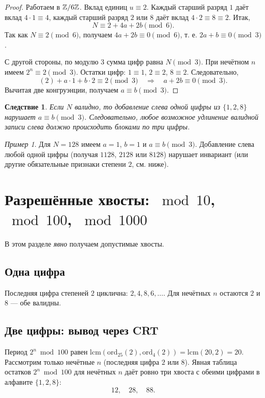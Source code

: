 \documentclass[12pt]{article}
\theoremstyle{plain}
\newtheorem{corollary}{Следствие}
\theoremstyle{remark}
\newtheorem*{example}{Пример}
\begin{document}
\begin{proof}
Работаем в $\Bbb Z/6\Bbb Z$. Вклад единиц $u\equiv2$. Каждый старший разряд $1$ даёт вклад $4\cdot1\equiv4$, каждый старший разряд $2$ или $8$ даёт вклад $4\cdot2\equiv8\equiv2$. Итак,
\[
N\equiv 2 + 4a + 2b \pmod6.
\]
Так как $N\equiv2\pmod6$, получаем $4a+2b\equiv0\pmod6$, т. е. $2a+b\equiv0\pmod3$.

С другой стороны, по модулю $3$ сумма цифр равна $N\pmod3$. При нечётном $n$ имеем $2^n\equiv2\pmod3$. Остатки цифр: $1\equiv1$, $2\equiv2$, $8\equiv2$. Следовательно,
\[
(2) + a\cdot1 + b\cdot2 \equiv 2 \pmod3 \quad\Rightarrow\quad a+2b\equiv0\pmod3.
\]
Вычитая две конгруэнции, получаем $a\equiv b\pmod3$.
\end{proof}

\begin{corollary}\label{cor:blocks}
Если $N$ валидно, то добавление слева одной цифры из $\{1,2,8\}$ нарушает $a\equiv b\pmod3$. Следовательно, любое возможное удлинение валидной записи слева должно происходить блоками по три цифры.
\end{corollary}

\begin{example}
Для $N=128$ имеем $a=1$, $b=1$ и $a\equiv b\pmod3$. Добавление слева любой одной цифры (получая $1128$, $2128$ или $8128$) нарушает инвариант (или другие обязательные признаки степени $2$, см. ниже).
\end{example}

\section{Разрешённые хвосты: \texorpdfstring{$\bmod 10$}{mod 10}, \texorpdfstring{$\bmod 100$}{mod 100}, \texorpdfstring{$\bmod 1000$}{mod 1000}}
В этом разделе \emph{явно} получаем допустимые хвосты.

\subsection*{Одна цифра}
Последняя цифра степеней $2$ циклична: $2,4,8,6,\ldots$. Для нечётных $n$ остаются $2$ и $8$ — обе валидны.

\subsection*{Две цифры: вывод через CRT}
Период $2^n\bmod100$ равен $\mathrm{lcm}(\mathrm{ord}_{25}(2),\mathrm{ord}_{4}(2))=\mathrm{lcm}(20,2)=20$. Рассмотрим только нечётные $n$ (последняя цифра $2$ или $8$). Явная таблица остатков $2^n\bmod100$ для нечётных $n$ даёт ровно три хвоста с обеими цифрами в алфавите $\{1,2,8\}$:
\begin{equation}\label{eq:tails2}
\boxed{12,\quad 28,\quad 88.}
\end{equation}
\end{document}
